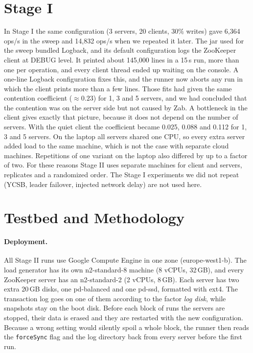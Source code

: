 \documentclass{llncs}
\begin{document}
\section{Stage I}
\label{sec:stage1}

In Stage I the same configuration (3 servers, 20 clients, 30\% writes) gave 6{,}364 ops/s in the sweep and 14{,}832 ops/s when we repeated it later. The jar used for the sweep bundled Logback, and its default configuration logs the ZooKeeper client at DEBUG level. It printed about 145{,}000 lines in a 15\,s run, more than one per operation, and every client thread ended up waiting on the console. A one-line Logback configuration fixes this, and the runner now aborts any run in which the client prints more than a few lines. Those fits had given the same contention coefficient ($\approx0.23$) for 1, 3 and 5 servers, and we had concluded that the contention was on the server side but not caused by Zab. A bottleneck in the client gives exactly that picture, because it does not depend on the number of servers. With the quiet client the coefficient became 0.025, 0.088 and 0.112 for 1, 3 and 5 servers. On the laptop all servers shared one CPU, so every extra server added load to the same machine, which is not the case with separate cloud machines. Repetitions of one variant on the laptop also differed by up to a factor of two. For these reasons Stage II uses separate machines for client and servers, replicates and a randomized order. The Stage I experiments we did not repeat (YCSB, leader failover, injected network delay) are not used here.

\section{Testbed and Methodology}
\label{sec:method}

\paragraph{Deployment.} All Stage II runs use Google Compute Engine in one zone (europe-west1-b). The load generator has its own n2-standard-8 machine (8 vCPUs, 32\,GB), and every ZooKeeper server has an n2-standard-2 (2 vCPUs, 8\,GB). Each server has two extra 20\,GB disks, one pd-balanced and one pd-ssd, formatted with ext4. The transaction log goes on one of them according to the factor \emph{log disk}, while snapshots stay on the boot disk. Before each block of runs the servers are stopped, their data is erased and they are restarted with the new configuration. Because a wrong setting would silently spoil a whole block, the runner then reads the \texttt{forceSync} flag and the log directory back from every server before the first run.
\end{document}
